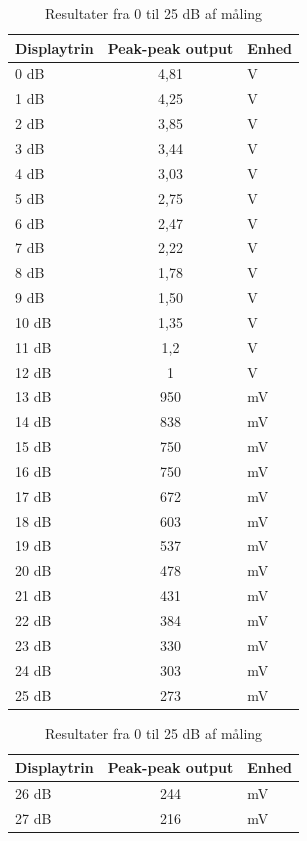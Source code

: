 \begin{table}[h]
\begin{minipage}[b]{0.45\linewidth}
\centering
\begin{tabular}{l|c|l}
\hline\hline
Displaytrin & Peak-peak output & Enhed \\
\hline\hline
0 dB & 4,81 & V \\[4pt]
1 dB & 4,25 & V \\[4pt]
2 dB & 3,85 & V \\[4pt]
3 dB & 3,44 & V \\[4pt]
4 dB & 3,03 & V \\[4pt]
5 dB & 2,75 & V \\[4pt]
6 dB & 2,47 & V \\[4pt]
7 dB & 2,22 & V \\[4pt]
8 dB & 1,78 & V \\[4pt]
9 dB & 1,50 & V \\[4pt]
10 dB & 1,35 & V \\[4pt]
11 dB & 1,2 & V \\[4pt]
12 dB & 1 & V \\[4pt]
13 dB & 950 & mV \\[4pt]
14 dB & 838 & mV \\[4pt]
15 dB & 750 & mV \\[4pt]
16 dB & 750 & mV \\[4pt]
17 dB & 672 & mV \\[4pt]
18 dB & 603 & mV \\[4pt]
19 dB & 537 & mV \\[4pt]
20 dB & 478 & mV \\[4pt]
21 dB & 431 & mV \\[4pt]
22 dB & 384 & mV \\[4pt]
23 dB & 330 & mV \\[4pt]
24 dB & 303 & mV \\[4pt]
25 dB & 273 & mV \\
\hline\hline
\end{tabular}
\caption{Resultater fra 0 til 25 dB af måling}
\label{tab:resultat_volumenkontrol}
\end{minipage}
\hspace{0.5cm}
\begin{minipage}[b]{0.45\linewidth}
\begin{tabular}{l|c|l}
\hline\hline
Displaytrin & Peak-peak output & Enhed \\
\hline\hline
26 dB & 244 & mV \\[4pt]
27 dB & 216 & mV \\[4pt]

\end{tabular}
\end{minipage}
\end{table}
